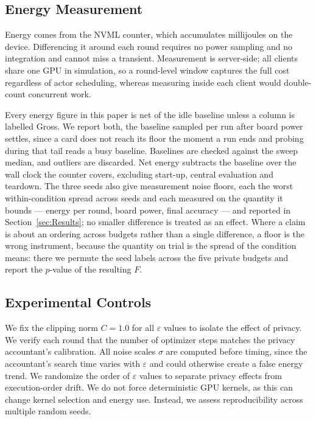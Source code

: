 \subsection{Energy Measurement}

Energy comes from the NVML counter, which accumulates
millijoules on the device. Differencing it around each round requires no power
sampling and no integration and cannot miss a transient. Measurement is
server-side; all clients
share one GPU in simulation, so a round-level window captures the full cost
regardless of actor scheduling, whereas measuring inside each client would
double-count concurrent work.

Every energy figure in this paper is net of the idle baseline unless a column
is labelled Gross. We report both, the baseline sampled per run after board
power settles, since a card does not reach its floor the moment a run
ends and probing during that tail reads a busy baseline. Baselines are checked
against the sweep median, and outliers are discarded. Net energy subtracts the
baseline over the wall clock the counter covers, excluding start-up, central
evaluation and teardown. The three seeds also give measurement noise floors, each the worst
within-condition spread across seeds and each measured on the quantity it
bounds --- energy per round, board power, final accuracy --- and reported in
Section~\ref{sec:Results}; no smaller difference is treated as an effect.
Where a claim is about an ordering across budgets rather than a single
difference, a floor is the wrong instrument, because the quantity on trial is
the spread of the condition means: there we permute the seed labels across
the five private budgets and report the $p$-value of the resulting $F$.

\subsection{Experimental Controls}
\label{sec:controls}

We fix the clipping norm $C = 1.0$ for all $\varepsilon$ values to isolate 
the effect of privacy. We verify each round that the number of optimizer steps 
matches the privacy accountant's calibration. All noise scales $\sigma$
 are computed before timing, since the accountant's search time varies with 
$\varepsilon$ and could otherwise create a false energy trend. We randomize the order of 
$\varepsilon$ values to separate privacy effects from execution-order drift. 
We do not force deterministic GPU kernels, as this can change kernel selection and energy use. 
Instead, we assess reproducibility across multiple random seeds.

